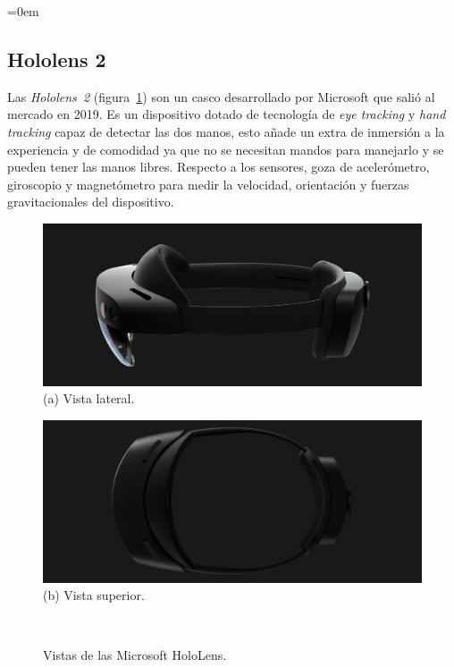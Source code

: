 \parindent=0em
\subsection{Hololens 2}
\label{HoloLens2Dispositivo}
\noindent

Las \textit{Hololens~2} (figura~\ref{fig:vistasHoloLens2}) son un casco desarrollado por Microsoft que salió al mercado en 2019. Es un dispositivo dotado de tecnología de \textit{eye tracking} y \textit{hand tracking} capaz de detectar las dos manos, esto añade un extra de inmersión a la experiencia y de comodidad ya que no se necesitan mandos para manejarlo y se pueden tener las manos libres. Respecto a los sensores, goza de acelerómetro, giroscopio y magnetómetro para medir la velocidad, orientación y fuerzas gravitacionales del dispositivo.\\


\begin{figure}[htbp]
\centering
    \hspace{-4mm}
    \begin{minipage}{0.5\textwidth}
        \centering
        \includegraphics[scale=0.2]{Images/Estado del arte/hololens2_2.jpeg}\\
        (a) Vista lateral.
    \end{minipage}
    \begin{minipage}{0.5\textwidth}
        \centering
        \includegraphics[scale=0.2]{Images/Estado del arte/hololens2_3.jpeg}\\
       (b) Vista superior.
    \end{minipage}\\
    \caption[Vistas de las Microsoft HoloLens]{Vistas de las Microsoft HoloLens\footnotemark.}
    \label{fig:vistasHoloLens2}
\end{figure}

